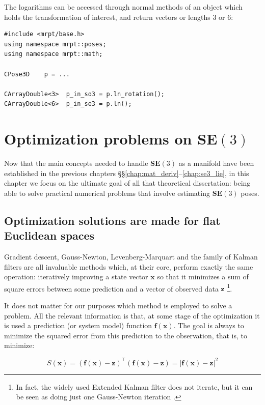 \documentclass[a4paper,11pt]{report}
\begin{document}
The logarithms can be accessed through normal methods of an object which 
holds the transformation of interest, and return vectors or lengths 3 or 6:

\begin{lstlisting}
#include <mrpt/base.h> 
using namespace mrpt::poses; 
using namespace mrpt::math;

CPose3D    p = ...

CArrayDouble<3>  p_in_so3 = p.ln_rotation();
CArrayDouble<6>  p_in_se3 = p.ln();
\end{lstlisting}




\chapter{Optimization problems on $\mathbf{SE}(3)$}
\label{ch:se3_optim}

Now that the main concepts needed to handle $\mathbf{SE}(3)$
as a manifold have been established in 
the previous chapters \S\S\ref{chap:mat_deriv}--\ref{chap:se3_lie}, 
in this chapter we focus on the ultimate goal of all that theoretical 
dissertation: being able to solve practical numerical 
problems that involve
estimating $\mathbf{SE}(3)$ poses.


\section{Optimization solutions are made for flat Euclidean spaces}

Gradient descent, Gauss-Newton, Levenberg-Marquart and the family of Kalman 
filters are all 
invaluable methods which, at their core, perform exactly the same operation:
iteratively improving a state vector $\mathbf{x}$ so that it minimizes 
a sum of square errors between some prediction and a vector of observed data $\mathbf{z}$
\footnote{In fact, the widely used Extended Kalman filter does not iterate, 
but it can be seen as doing just one Gauss-Newton iteration \cite{bell1993ikf}.}.

It does not matter for our purposes which method is employed to solve a problem. 
All the relevant information is that, at some stage of the optimization 
it is used a prediction (or system model) function 
$\mathbf{f}(\mathbf{x})$. 
The goal is always to minimize the squared error from 
this prediction to the observation, that is, 
to minimize:

\begin{equation}
S(\mathbf{x}) = (\mathbf{f}(\mathbf{x})-\mathbf{z})^\top (\mathbf{f}(\mathbf{x})-\mathbf{z})
 = | \mathbf{f}(\mathbf{x})-\mathbf{z} |^2
\end{equation}
\end{document}

